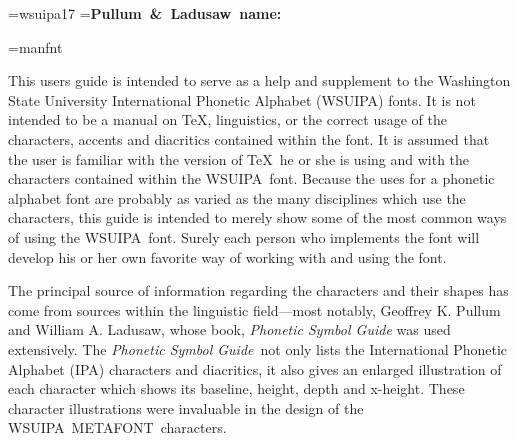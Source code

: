 
\asisformat{\skipbefore{6pt}
            \everyasis{\leftindent{.5in}\rightindent{.5in}\tt}
            \skipafter{6pt}}
\font\smokefont=wsuipa17
\newbox\tagbox
\setbox\tagbox=\hbox{\tenpt\bf Pullum \&\ Ladusaw name:}
 
\font\mf=manfnt
\def\deg{$^\circ$}
 
\def\meta{{\mf METAFONT}}
\def\wsu{{\tenpt WSUIPA}}
\def\ipam{{\tenpt IPAMACS}}
\def\PL{{\it Phonetic Symbol Guide}}
 
\def\pos#1{\vs{10pt}\hrule width 1in\vs{1pt}\hrule width 1in
    \noindent\label{\hfill\tenbf WSUIPA Char' Position:}\rm #1\par}
\def\pl#1{\noindent\label{\hfill\tenbf Pullum \&\ Ladusaw name:}\rm #1\par}
\def\mac#1{\noindent\label{\hfill\tenbf IPAMACS Name:}\tt\char'134 #1\par}
\def\smoke#1{\noindent\label{\hfill\tenbf IPA Character:}
\smokefont\char#1\par}
\fourteenpt
{}
\twelvept
 
 
This users guide is intended to serve as a help and supplement to the
Washington State University International Phonetic Alphabet (\wsu) fonts.
It is not intended to be a manual on \TeX, linguistics, or the correct usage of
the characters, accents and diacritics contained within the font.
It is assumed that the user is familiar with the version of \TeX\ he or she is
using and with the characters contained within the \wsu\ font.
Because the uses for a phonetic alphabet font are probably as varied as the
many disciplines which use the characters, this guide is intended to merely
show some of the most common ways of using the \wsu\ font. Surely each person
who implements the font will develop his or her own favorite way of working with
 and
using the font.
 
The principal
source of information regarding the characters and their shapes has come from
sources within the linguistic field---most
notably, Geoffrey K. Pullum and William A. Ladusaw, whose book, {\it Phonetic
Symbol Guide} was used extensively.
The \PL\  not only lists the International Phonetic Alphabet (IPA) characters
and diacritics, it also
gives an enlarged illustration of each character which shows its baseline,
height, depth and x-height. These character illustrations were invaluable
in the design of the \wsu\ \meta\ characters.
 
